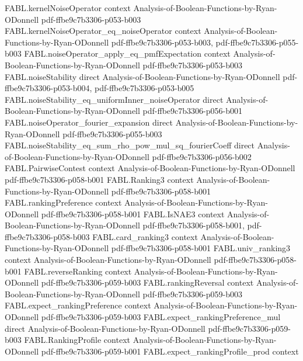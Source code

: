 \begin{theorem}
  {FABL.kernelNoiseOperator}
  {context}
  {Analysis-of-Boolean-Functions-by-Ryan-ODonnell}
  {pdf-ffbe9c7b3306-p053-b003}
\proofstep
  {FABL.kernelNoiseOperator_eq_noiseOperator}
  {context}
  {Analysis-of-Boolean-Functions-by-Ryan-ODonnell}
  {pdf-ffbe9c7b3306-p053-b003,
    pdf-ffbe9c7b3306-p055-b003}
\proofstep
  {FABL.noiseOperator_apply_eq_pmfExpectation}
  {context}
  {Analysis-of-Boolean-Functions-by-Ryan-ODonnell}
  {pdf-ffbe9c7b3306-p053-b003}
\proofstep
  {FABL.noiseStability}
  {direct}
  {Analysis-of-Boolean-Functions-by-Ryan-ODonnell}
  {pdf-ffbe9c7b3306-p053-b004,
    pdf-ffbe9c7b3306-p053-b005}
\proofstep
  {FABL.noiseStability_eq_uniformInner_noiseOperator}
  {direct}
  {Analysis-of-Boolean-Functions-by-Ryan-ODonnell}
  {pdf-ffbe9c7b3306-p056-b001}
\proofstep
  {FABL.noiseOperator_fourier_expansion}
  {direct}
  {Analysis-of-Boolean-Functions-by-Ryan-ODonnell}
  {pdf-ffbe9c7b3306-p055-b003}
\proofstep
  {FABL.noiseStability_eq_sum_rho_pow_mul_sq_fourierCoeff}
  {direct}
  {Analysis-of-Boolean-Functions-by-Ryan-ODonnell}
  {pdf-ffbe9c7b3306-p056-b002}
\proofstep
  {FABL.PairwiseContest}
  {context}
  {Analysis-of-Boolean-Functions-by-Ryan-ODonnell}
  {pdf-ffbe9c7b3306-p058-b001}
\proofstep
  {FABL.Ranking3}
  {context}
  {Analysis-of-Boolean-Functions-by-Ryan-ODonnell}
  {pdf-ffbe9c7b3306-p058-b001}
\proofstep
  {FABL.rankingPreference}
  {context}
  {Analysis-of-Boolean-Functions-by-Ryan-ODonnell}
  {pdf-ffbe9c7b3306-p058-b001}
\proofstep
  {FABL.IsNAE3}
  {context}
  {Analysis-of-Boolean-Functions-by-Ryan-ODonnell}
  {pdf-ffbe9c7b3306-p058-b001,
    pdf-ffbe9c7b3306-p058-b003}
\proofstep
  {FABL.card_ranking3}
  {context}
  {Analysis-of-Boolean-Functions-by-Ryan-ODonnell}
  {pdf-ffbe9c7b3306-p058-b001}
\proofstep
  {FABL.univ_ranking3}
  {context}
  {Analysis-of-Boolean-Functions-by-Ryan-ODonnell}
  {pdf-ffbe9c7b3306-p058-b001}
\proofstep
  {FABL.reverseRanking}
  {context}
  {Analysis-of-Boolean-Functions-by-Ryan-ODonnell}
  {pdf-ffbe9c7b3306-p059-b003}
\proofstep
  {FABL.rankingReversal}
  {context}
  {Analysis-of-Boolean-Functions-by-Ryan-ODonnell}
  {pdf-ffbe9c7b3306-p059-b003}
\proofstep
  {FABL.expect_rankingPreference}
  {context}
  {Analysis-of-Boolean-Functions-by-Ryan-ODonnell}
  {pdf-ffbe9c7b3306-p059-b003}
\proofstep
  {FABL.expect_rankingPreference_mul}
  {direct}
  {Analysis-of-Boolean-Functions-by-Ryan-ODonnell}
  {pdf-ffbe9c7b3306-p059-b003}
\proofstep
  {FABL.RankingProfile}
  {context}
  {Analysis-of-Boolean-Functions-by-Ryan-ODonnell}
  {pdf-ffbe9c7b3306-p059-b001}
\proofstep
  {FABL.expect_rankingProfile_prod}
  {context}

\end{theorem}

